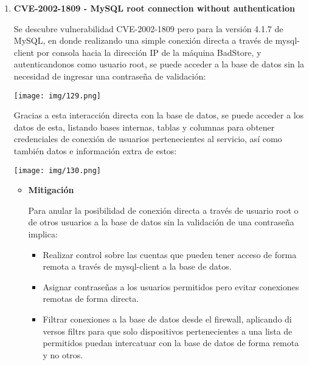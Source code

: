 \documentclass[12pt,oneside,a4paper]{book}
\begin{document}
\begin{enumerate}
\vspace{2em}

\item 	\textbf{CVE-2002-1809 - MySQL root connection without authentication}

\vspace{1em}

\hspace{20pt}
Se descubre vulnerabilidad CVE-2002-1809 pero para la versión 4.1.7 de MySQL, en donde realizando una simple conexión directa a través de mysql-client por consola hacia la dirección IP de la máquina BadStore, y autenticandonos como usuario root, se puede acceder a la base de datos sin la necesidad de ingresar una contraseña de validación:

\vspace{1em}

\begin{center}
    \texttt{[image: img/129.png]}
\end{center}

\vspace{1em}

\hspace{20pt}
Gracias a esta interacción directa con la base de datos, se puede acceder a los datos de esta, listando bases internas, tablas y columnas para obtener credenciales de conexión de usuarios pertenecientes al servicio, así como también datos e información extra de estos:

\vspace{1em}

\begin{center}
    \texttt{[image: img/130.png]}
\end{center}

\vspace{2em}

\begin{itemize}
	\item 	\textbf{Mitigación}

\vspace{1em}

\hspace{20pt}
Para anular la posibilidad de conexión directa a través de usuario root o de otros usuarios a la base de datos sin la validación de una contraseña implica:

\begin{itemize}
\item Realizar control sobre las cuentas que pueden tener acceso de forma remota a través de mysql-client a la base de datos.
\item Asignar contraseñas a los usuarios permitidos pero evitar conexiones remotas de forma directa.
\item Filtrar conexiones a la base de datos desde el firewall, aplicando di versos filtrs para que solo dispositivos pertenecientes a una lista de permitidos puedan intercatuar con la base de datos de forma remota y no otros.
\end{itemize}
\end{itemize}


\end{enumerate}
\end{document}
